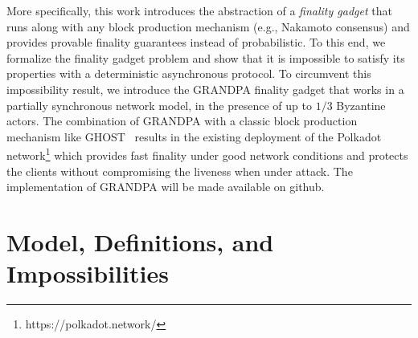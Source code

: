 \documentclass[a4paper,UKenglish,cleveref, autoref, thm-restate, anonymous]{lipics-v2019}
\begin{document}
More specifically, this work introduces the abstraction of a \emph{finality gadget} that runs along with any block production mechanism (e.g., Nakamoto consensus) and
provides provable finality guarantees instead of probabilistic.
To this end, we formalize the finality gadget problem and show that it is impossible to satisfy its properties with a deterministic asynchronous protocol. 
To circumvent this impossibility result, we introduce the GRANDPA finality gadget that works in a partially synchronous network model, in the presence of up to $1/3$ Byzantine actors. 
The combination of GRANDPA with a classic block production mechanism like GHOST~\cite{lewenberg15inclusive} results in the existing deployment of the Polkadot network\footnote{https://polkadot.network/} which provides fast finality under good network conditions and protects the clients without compromising the liveness when under attack. The implementation of GRANDPA will be made available on github.





\section{Model, Definitions, and Impossibilities}
\end{document}
